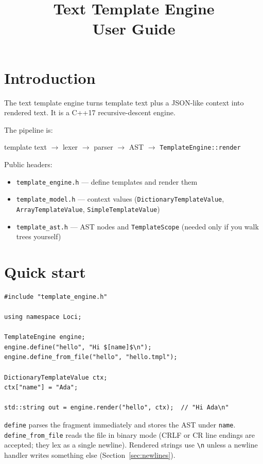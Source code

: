 \documentclass[11pt,letterpaper]{article}
\title{Text Template Engine\\User Guide}
\author{}
\date{}
\newcommand{\file}[1]{\texttt{#1}}
\newcommand{\api}[1]{\texttt{#1}}
\begin{document}
\maketitle
\tableofcontents
\newpage

\section{Introduction}

The text template engine turns template text plus a JSON-like context into
rendered text. It is a C++17 recursive-descent engine.

The pipeline is:

\begin{center}
template text $\rightarrow$ lexer $\rightarrow$ parser $\rightarrow$ AST
$\rightarrow$ \api{TemplateEngine::render}
\end{center}

Public headers:

\begin{itemize}[nosep]
  \item \file{template\_engine.h} --- define templates and render them
  \item \file{template\_model.h} --- context values (\api{DictionaryTemplateValue},
        \api{ArrayTemplateValue}, \api{SimpleTemplateValue})
  \item \file{template\_ast.h} --- AST nodes and \api{TemplateScope}
        (needed only if you walk trees yourself)
\end{itemize}

\section{Quick start}

\begin{lstlisting}
#include "template_engine.h"

using namespace Loci;

TemplateEngine engine;
engine.define("hello", "Hi $[name]$\n");
engine.define_from_file("hello", "hello.tmpl");

DictionaryTemplateValue ctx;
ctx["name"] = "Ada";

std::string out = engine.render("hello", ctx);  // "Hi Ada\n"
\end{lstlisting}

\api{define} parses the fragment immediately and stores the AST under
\texttt{name}. \api{define\_from\_file} reads the file in binary mode (CRLF or
CR line endings are accepted; they lex as a single newline). Rendered strings
use \texttt{\textbackslash n} unless a newline handler writes something else
(Section~\ref{sec:newlines}).
\end{document}
